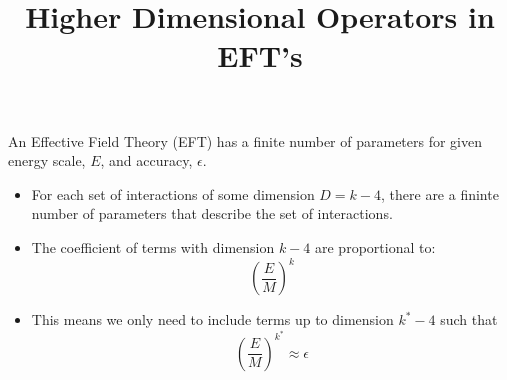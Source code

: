 \documentclass[11pt,letterpaper]{article}
\numberwithin{equation}{section}
\begin{document}
\title{Higher Dimensional Operators in EFT's}

\maketitle

An Effective Field Theory (EFT) has a finite number of parameters for given energy scale, $E$, and accuracy, $\epsilon$.
\begin{itemize}
\item For each set of interactions of some dimension $D=k-4$, there are a fininte number of parameters that describe the set of interactions.
\item The coefficient of terms with dimension $k-4$ are proportional to:
\[\left(\frac{E}{M}\right)^k\]
\item This means we only need to include terms up to dimension $k^*-4$ such that \[\left(\frac{E}{M}\right)^{k^*}\approx\epsilon\]
\end{itemize}


\end{document}
